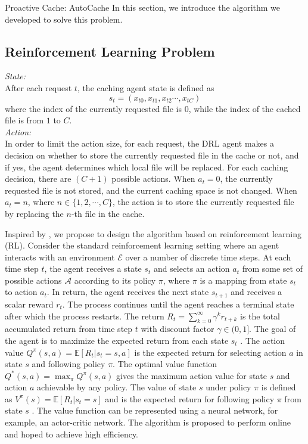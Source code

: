 \documentclass{article}
\begin{document}
\begin{section}{Proactive Cache: AutoCache}
    \label{algorithm}
    In this section, we introduce the algorithm we developed to solve this problem.

    \subsection{Reinforcement Learning Problem}
    \emph{State:}\\
    After each request $t$, the caching agent state is defined as
    $$
        s_t=\left(x_{t0},x_{t1},x_{t2}\cdots,x_{tC}\right)
    $$
    where the index of the currently requested file is $0$, while the index of the cached file is from $1$ to $C$.\\
    \emph{Action:}\\
    In order to limit the action size, for each request, the DRL agent makes a decision on whether to store the currently requested file in the cache or not, and if yes, the agent determines which local file will be replaced. For each caching decision, there are $(C+1)$ possible actions. When $a_t=0$, the currently requested file is not stored, and the current caching space is not changed. When $a_t=n$, where $n\in\{1,2,\cdots,C\}$, the action is to store the currently requested file by replacing the $n$-th file in the cache.

    Inspired by \cite{Pensieve}, we propose to design the algorithm based on reinforcement learning (RL). Consider the standard reinforcement learning setting where an agent interacts with an environment $\mathcal{E}$ over a number of discrete time steps. At each time step $t$, the agent receives a state $s_t$ and selects an action $a_t$ from some set of possible actions $\mathcal{A}$ according to its policy $\pi$, where $\pi$ is a mapping from state $s_t$ to action $a_t$. In return, the agent receives the next state $s_{t+1}$ and receives a scalar reward $r_t$. The process continues until the agent reaches a terminal state after which the process restarts. The return $R_t=\sum_{k=0}^{\infty}\gamma^k r_{t+k}$ is the total accumulated return from time step $t$ with discount factor $\gamma\in(0,1]$. The goal of the agent is to maximize the expected return from each state $s_t$ \cite{rl-intro}. The action value $Q^{\pi}(s,a)=\mathbb{E}[R_t|s_t=s,a]$ is the expected return for selecting action $a$ in state $s$ and following policy $\pi$. The optimal value function $Q^*(s,a)=\max_{\pi}Q^{\pi}(s,a)$ gives the maximum action value for state $s$ and action $a$ achievable by any policy. The value of state $s$ under policy $\pi$ is defined as $V^{\pi}(s)=\mathbb{E}[R_t|s_t=s]$ and is the expected return for following policy $\pi$ from state $s$ \cite{DBLP:journals/corr/MnihBMGLHSK16}. The value function can be represented using a neural network, for example, an actor-critic network. The algorithm is proposed to perform online and hoped to achieve high efficiency.
\end{section}
\end{document}
